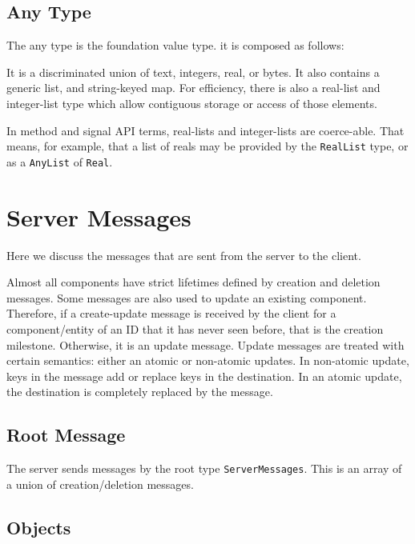 \documentclass[11pt, oneside]{amsart}
\begin{document}
\subsection{Any Type}
The any type is the foundation value type. it is composed as follows:



It is a discriminated union of text, integers, real, or bytes. It also contains a generic list, and string-keyed map. For efficiency, there is also a real-list and integer-list type which allow contiguous storage or access of those elements.

In method and signal API terms, real-lists and integer-lists are coerce-able. That means, for example, that a list of reals may be provided by the \texttt{RealList} type, or as a \texttt{AnyList} of \texttt{Real}.

\section{Server Messages}
\label{sec:server_message}

Here we discuss the messages that are sent from the server to the client.

Almost all components have strict lifetimes defined by creation and deletion messages. Some messages are also used to update an existing component. Therefore, if a create-update message is received by the client for a component/entity of an ID that it has never seen before, that is the creation milestone. Otherwise, it is an update message. Update messages are treated with certain semantics: either an atomic or non-atomic updates. In non-atomic update, keys in the message add or replace keys in the destination. In an atomic update, the destination is completely replaced by the message.
\subsection{Root Message}

The server sends messages by the root type \texttt{ServerMessages}. This is an array of a union of creation/deletion messages.



\subsection{Objects}
\end{document}
